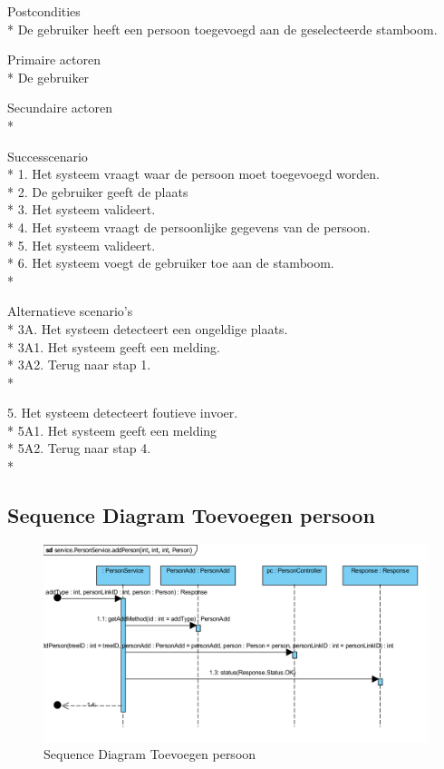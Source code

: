 \documentclass[pdftex,a4paper,12pt,twoside]{report}
\begin{document}
Postcondities \\*
De gebruiker heeft een persoon toegevoegd aan de geselecteerde stamboom.

Primaire actoren \\*
De gebruiker

Secundaire actoren \\*

Successcenario\\*
1. Het systeem vraagt waar de persoon moet toegevoegd worden.\\*
2. De gebruiker geeft de plaats \\*
3. Het systeem valideert.	\\*
4. Het systeem vraagt de persoonlijke gegevens van de persoon.\\*
5. Het systeem valideert.\\*
6. Het systeem voegt de gebruiker toe aan de stamboom.\\*

Alternatieve scenario’s\\*
3A. Het systeem detecteert een ongeldige plaats.\\*
3A1. Het systeem geeft een melding.\\*
3A2. Terug naar stap 1.\\*

5. Het systeem detecteert foutieve invoer.\\*
5A1. Het systeem geeft een melding\\*
5A2. Terug naar stap 4.\\*

\subsection{Sequence Diagram Toevoegen persoon}
\begin{figure}[!htb]
\includegraphics[width=\textwidth]{images/persoontoevoegen.png}
\caption{Sequence Diagram Toevoegen persoon}
\end{figure}
\end{document}
